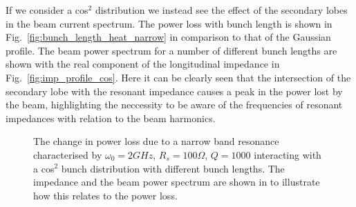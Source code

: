 \documentclass{cernrep}
\begin{document}
If we consider a cos$^{2}$ distribution we instead see the effect of the secondary lobes in the beam current spectrum. The power loss with bunch length is shown in Fig.~\ref{fig:bunch_length_heat_narrow} in comparison to that of the Gaussian profile. The beam power spectrum for a number of different bunch lengths are shown with the real component of the longitudinal impedance in Fig.~\ref{fig:imp_profile_cos}. Here it can be clearly seen that the intersection of the secondary lobe with the resonant impedance causes a peak in the power lost by the beam, highlighting the neccessity to be aware of the frequencies of resonant impedances with relation to the beam harmonics.


\begin{figure}
\caption{ The change in power loss due to a narrow band resonance characterised by $\omega_{0} = 2GHz$, $R_{s} = 100\Omega$, $Q = 1000$ interacting with a cos$^{2}$ bunch distribution with different bunch lengths. The impedance and the beam power spectrum are shown in  to illustrate how this relates to the power loss.}
\end{figure}
\end{document}
